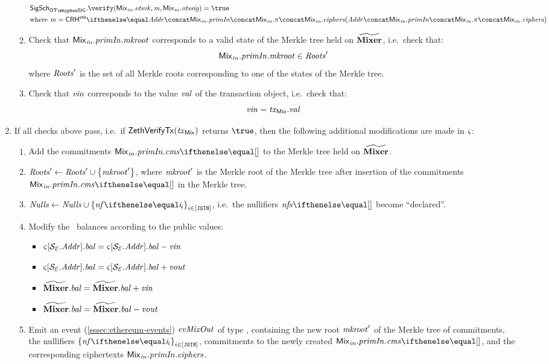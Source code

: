 \begin{enumerate}
\begin{enumerate}
                \begin{align*}
                    & \otsigscheme.\verify(\inp{\mix}.\otsvk, \msg, \inp{\mix}.\otssig) = \true \\
                    & \text{where} \ \msg = \crhots{\addr \concat \inp{\mix}.\primInp \concat \inp{\mix}.\zkp \concat \inp{\mix}.\ciphers}
                \end{align*}
            \item Check that $\mathit{{\mathsf{Mix}}_{in}}.\mathit{primIn}.\mathit{mkroot}$ corresponds to a valid state of the Merkle tree held on $\widetilde{\mathbf{Mixer}}$, i.e.~check that:
                \[
                    \mathit{{\mathsf{Mix}}_{in}}.\mathit{primIn}.\mathit{mkroot} \in \mathit{Roots}'
                \]
                where $\mathit{Roots}'$ is the set of all Merkle roots corresponding to one of the states of the Merkle tree.
            \item Check that $\mathit{vin}$ corresponds to the value $\mathit{val}$ of the transaction object, i.e.~check that:
                \[
                    \mathit{vin} = \mathit{\mathit{tx}_{\mathsf{Mix}}}.\mathit{val}
                \]
        \end{enumerate}
    \item If all checks above pass, i.e.~if $\mathsf{ZethVerifyTx}(\mathit{\mathit{tx}_{\mathsf{Mix}}})$ returns $\true$, then the following additional modifications are made in $\mathit{\varsigma}$:
        \begin{enumerate}
            \item Add the commitments $\inp{\mix}.\primInp.\cms{}$ to the Merkle tree held on $\widetilde{\mathbf{Mixer}}$.
            \item $\mathit{Roots}' \gets \mathit{Roots}' \cup \left\{{\mathit{mkroot}'}\right\}$, where $\mathit{mkroot}'$ is the Merkle root of the Merkle tree after insertion of the commitments $\inp{\mix}.\primInp.\cms{}$ in the Merkle tree.
            \item $\nullifierset \gets \nullifierset \cup \indexedset{\nf{i}}{i \in [\jsin]}$, i.e.~the nullifiers $\nfs{}$ become ``declared''.
            \item Modify the \ethereum~balances according to the public values:
                \begin{itemize}
                    \item $\mathit{\varsigma}[\mathcal{{S}_{E}}.\mathit{Addr}].\mathit{bal} = \mathit{\varsigma}[\mathcal{{S}_{E}}.\mathit{Addr}].\mathit{bal} - \mathit{vin}$
                    \item $\mathit{\varsigma}[\mathcal{{S}_{E}}.\mathit{Addr}].\mathit{bal} = \mathit{\varsigma}[\mathcal{{S}_{E}}.\mathit{Addr}].\mathit{bal} + \mathit{vout}$
                    \item $\widetilde{\mathbf{Mixer}}.\mathit{bal} = \widetilde{\mathbf{Mixer}}.\mathit{bal} + \mathit{vin}$
                    \item $\widetilde{\mathbf{Mixer}}.\mathit{bal} = \widetilde{\mathbf{Mixer}}.\mathit{bal} - \mathit{vout}$
                \end{itemize}
            \item Emit an event (\cref{sssec:ethereum-events}) $\mathit{evMixOut}$ of type \mixEventDType, containing the new root $\mathit{mkroot}'$ of the Merkle tree of commitments, the nullifiers $\indexedset{\nf{i}}{i \in [\jsin]}$, commitments to the newly created \zethnotes $\inp{\mix}.\primInp.\cms{}$, and the corresponding ciphertexts $\mathit{{\mathsf{Mix}}_{in}}.\mathit{primIn}.\mathit{ciphers}$.
        \end{enumerate}
\end{enumerate}
